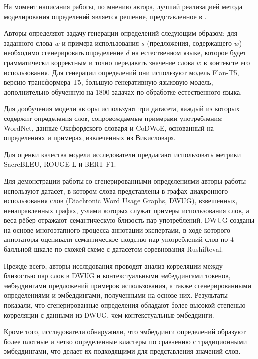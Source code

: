 \documentclass[LI,VKR]{HSEUniversity}
\begin{document}
На момент написания работы, по мнению автора, лучший реализацией метода моделирования определений
является решение, представленное в \cite{DefinitionGenerationMainArticle}.

Авторы определяют задачу генерации определений следующим образом: для заданного слова \(w\) и примера
использования \(s\) (предложения, содержащего \(w\)) необходимо сгенерировать определение \(d\) на
естественном языке, которое будет грамматически корректным и точно передавать значение слова
\(w\) в контексте его использования.
Для генерации определений они используют модель Flan-T5, версию трансформера T5,
большую генеративную языковую модель,
дополнительно обученную на 1800 задачах по обработке естественного языка.


Для дообучения модели авторы используют три датасета, каждый из которых содержит определения
слов, сопровождаемые примерами употребления: WordNet, данные Оксфордского словаря и CoDWoE,
основанный на определениях и примерах, извлеченных из Викисловаря.

Для оценки качества модели исследователи предлагают использовать метрики SacreBLEU, ROUGE-L и BERT-F1.

Для демонстрации работы со сгенерированными определениями авторы
работы используют датасет, в котором слова представлены в графах диахронного использования
слов (Diachronic Word Usage Graphs, DWUG), взвешенных, ненаправленных графах,
узлами которых служат примеры использования слов, а веса рёбер отражают семантическую
близость пар употреблений.
DWUG созданы на основе многоэтапного процесса аннотации экспертами, в ходе которого аннотаторы
оценивали семантическое сходство пар употреблений слов по 4-балльной шкале
по схожей схеме с датасетом соревнования Rushifteval.

Прежде всего, авторы исследования проводят анализ корреляции между близостью пар слов в DWUG
и контекстуальными эмбеддингами токенов, эмбеддингами предложений примеров использования, а также
сгенерированными определениями и эмбеддингами, полученными на основе них.
Результаты показали, что сгенерированные определения обладают более высокой степенью
корреляции с данными из DWUG, чем контекстуальные эмбеддинги.

Кроме того, исследователи обнаружили, что эмбеддинги определений образуют более плотные и четко определенные
кластеры по сравнению с традиционными эмбеддингами, что делает их
подходящими для представления значений слов.
\end{document}
